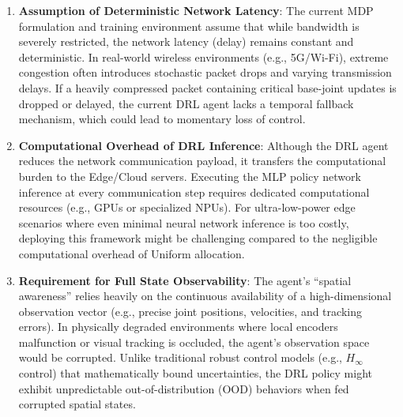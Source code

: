 \begin{enumerate}
    \item \textbf{Assumption of Deterministic Network Latency}: The current MDP formulation and training environment assume that while bandwidth is severely restricted, the network latency (delay) remains constant and deterministic.
          In real-world wireless environments (e.g., 5G/Wi-Fi), extreme congestion often introduces stochastic packet drops and varying transmission delays. If a heavily compressed packet containing critical base-joint updates is dropped or delayed, the current DRL agent lacks a temporal fallback mechanism, which could lead to momentary loss of control.
    \item \textbf{Computational Overhead of DRL Inference}: Although the DRL agent reduces the network communication payload, it transfers the computational burden to the Edge/Cloud servers. 
           Executing the MLP policy network inference at every communication step requires dedicated computational resources (e.g., GPUs or specialized NPUs). For ultra-low-power edge scenarios where even minimal neural network inference is too costly, deploying this framework might be challenging compared to the negligible computational overhead of Uniform allocation.
    \item \textbf{Requirement for Full State Observability}: The agent's ``spatial awareness'' relies heavily on the continuous availability of a high-dimensional observation vector (e.g., precise joint positions, velocities, and tracking errors). In physically degraded environments where local encoders malfunction or visual tracking is occluded, the agent's observation space would be corrupted. Unlike traditional robust control models (e.g., $H_\infty$ control) 
          that mathematically bound uncertainties, the DRL policy might exhibit unpredictable out-of-distribution (OOD) behaviors when fed corrupted spatial states.
\end{enumerate}
